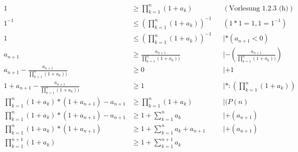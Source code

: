 \documentclass{article}
\begin{document}
\begin{enumerate}[label={Fall \arabic*}]
  \begin{align*}
    1                                                                   &\geq \prod\limits_{k = 1}^n (1 + a_k)                     && (\text{Vorlesung 1.2.3 (h)}) \\
    1^{-1}                                                              &\leq (\prod\limits_{k = 1}^n (1 + a_k))^{-1}              && (1 * 1 = 1, 1 = 1^{-1}) \\
    1                                                                   &\leq(\prod\limits_{k = 1}^n (1 + a_k))^{-1}               && | *(a_{n + 1} < 0) \\
    a_{n + 1}                                                           &\geq \frac{a_{n + 1}}{\prod\limits_{k = 1}^n (1 + a_k))}  && | -(\frac{a_{n + 1}}{\prod\limits_{k = 1}^n (1 + a_k))}) \\
    a_{n + 1} - \frac{a_{n + 1}}{\prod\limits_{k = 1}^n (1 + a_k))}     &\geq 0                                                    && | +1 \\
    1 + a_{n + 1} - \frac{a_{n + 1}}{\prod\limits_{k = 1}^n (1 + a_k))} &\geq 1                                                    && | *:(\prod\limits_{k = 1}^n (1 + a_k)) \\
    \prod\limits_{k = 1}^n (1 + a_k) * (1 + a_{n + 1}) - a_{n + 1}      &\geq \prod\limits_{k = 1}^n (1 + a_k)                     && | (P(n) \\
    \prod\limits_{k = 1}^n (1 + a_k) * (1 + a_{n + 1}) - a_{n + 1}      &\geq 1 + \sum\limits_{k = 1}^n a_k                        && | + (a_{n + 1}) \\
    \prod\limits_{k = 1}^n (1 + a_k) * (1 + a_{n + 1})                  &\geq 1 + \sum\limits_{k = 1}^n a_k + a_{n + 1}            && | + (a_{n + 1}) \\
    \prod\limits_{k = 1}^{n + 1} (1 + a_k)                              &\geq 1 + \sum\limits_{k = 1}^{n + 1} a_k \\
  \end{align*}


\end{enumerate}
\end{document}
